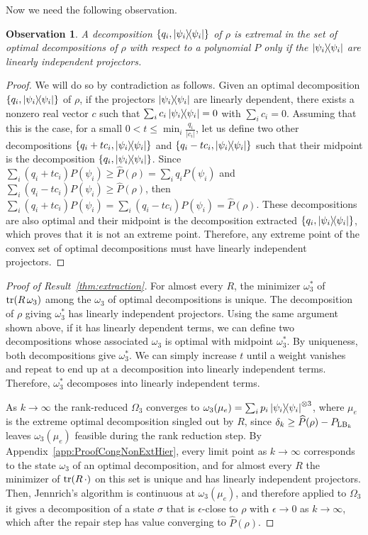 \documentclass[11pt,a4paper]{report}
\newtheorem{observation}[theorem]{Observation}
\begin{document}
Now we need the following observation.
\begin{observation}
    A decomposition $\{q_i, \dyad{\psi_i}\}$ of $\rho$ is extremal in the set of optimal decompositions of $\rho$ with respect to a polynomial $P$ only if the $\dyad{\psi_i}$ are linearly independent projectors.
\end{observation}
\begin{proof}
We will do so by contradiction as follows. Given an optimal decomposition $\{q_i, \dyad{\psi_i}\}$ of $\rho$, if the projectors $\dyad{\psi_i}$ are linearly dependent, there exists a nonzero real vector $c$ such that $\sum_i c_i \dyad{\psi_i} = 0$ with $\sum_i c_i=0$.
Assuming that this is the case, for a small $0<t\leq \min_i \tfrac{q_i}{|c_i|}$, let us define two other decompositions $\{q_i + t c_i, \dyad{\psi_i}\}$ and $\{q_i - t c_i, \dyad{\psi_i}\}$ such that their midpoint is the decomposition $\{q_i, \dyad{\psi_i}\}$.
Since $\sum_i (q_i+t c_i) P(\psi_i) \geq \widehat{P}(\rho)=\sum_i q_i P(\psi_i)$ and $\sum_i (q_i- t c_i) P(\psi_i) \geq \widehat{P}(\rho)$, then $\sum_i (q_i+ t c_i) P(\psi_i) = \sum_i (q_i- t c_i) P(\psi_i)= \widehat{P}(\rho)$.
These decompositions are also optimal and their midpoint is the decomposition extracted $\{q_i, \dyad{\psi_i}\}$, which proves that it is not an extreme point. Therefore, any extreme point of the convex set of optimal decompositions must have linearly independent projectors.
\end{proof}

\begin{proof}[Proof of Result~\ref{thm:extraction}]
For almost every $R$, the minimizer $\omega_3^*$ of $\tr(R\,\omega_3)$ among the $\omega_3$ of optimal decompositions is unique. The decomposition of $\rho$ giving $\omega_3^*$ has linearly independent projectors. Using the same argument shown above, if it has linearly dependent terms, we can define two decompositions whose associated $\omega_3$ is optimal with midpoint $\omega_3^*$. By uniqueness, both decompositions give $\omega_3^*$. We can simply increase $t$ until a weight vanishes and repeat to end up at a decomposition into linearly independent terms. Therefore, $\omega_3^*$ decomposes into linearly independent terms.

As $k\to\infty$ the rank-reduced $\Omega_3$ converges to $\omega_3(\mu_e)=\sum_ip_i\dyad{\psi_i}^{\otimes3}$, where
$\mu_e$ is the extreme optimal decomposition singled out by $R$, since $\delta_k \geq \widehat{P}(\rho)-P_{{\rm LB}_k}$ leaves $\omega_3(\mu_e)$ feasible during the rank reduction step.
By Appendix~\ref{app:ProofCongNonExtHier}, every limit point as $k\to \infty$ corresponds to the state $\omega_3$ of an optimal decomposition, and for almost every $R$ the minimizer of $\tr(R\,\cdot)$ on this set is unique and has linearly independent projectors.
Then, Jennrich's algorithm is continuous at $\omega_3(\mu_e)$, and therefore applied to $\Omega_3$ it gives a decomposition of a state $\sigma$ that is $\epsilon$-close to $\rho$ with $\epsilon\to0$ as $k\to\infty$, which after the repair step has value converging to $\widehat{P}(\rho)$.
\end{proof}
\end{document}
